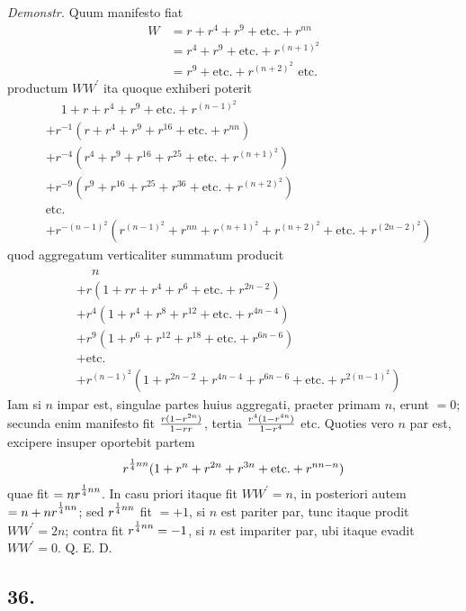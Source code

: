 \documentclass[twoside,12pt, showframe]{memoir}
\let\oldfrac\frac
\def\frac#1#2{\mathchoice{\tfrac{#1}{#2}}{\oldfrac{#1}{#2}}{\genfrac{}{}{}{2}{#1}{#2\mathstrut}}{\genfrac{}{}{}{3}{#1}{#2\mathstrut}}}
\begin{document}
\textit{Demonstr.} Quum manifesto fiat
\[\begin{aligned}
W & =r+r^{4}+r^{9}+\text{etc.}+r^{n n} \\
& =r^{4}+r^{9}+\text{etc.}+r^{(n+1)^{2}} \\
& =r^{9}+\text{etc.}+r^{(n+2)^{2}} \text{ etc.}
\end{aligned}\]
productum \(W {W}^{\prime}\) ita quoque exhiberi poterit
\[\begin{aligned}
&\phantom{ +, } 1+r+r^{4}+r^{9}+\text{etc.}+r^{(n-1)^{2}} \\
&+ r^{-1}(r+r^{4}+r^{9}+r^{16}+\text{etc.}+r^{n n}) \\
&+ r^{-4}(r^{4}+r^{9}+r^{16}+r^{25}+\text{etc.}+r^{(n+1)^{2}}) \\
&+ r^{-9}(r^{9}+r^{16}+r^{25}+r^{36}+\text{etc.}+r^{(n+2)^{2}}) \\
&\text{etc.} \\
&+ r^{-(n-1)^{2}}(r^{(n-1)^{2}}+r^{n n}+r^{(n+1)^{2}}+r^{(n+2)^{2}}+\text{etc.}+r^{(2 n-2)^{2}})
\end{aligned}\]
quod aggregatum verticaliter summatum producit
\[\begin{aligned}
&\phantom{+}n \\
&+r(1+r r+r^{4}+r^{6}+\text{etc.}+r^{2 n-2}) \\
&+r^{4}(1+r^{4}+r^{8}+r^{12}+\text{etc.}+r^{4 n-4}) \\
&+r^{9}(1+r^{6}+r^{12}+r^{18}+\text{etc.}+r^{6 n-6}) \\
&+\text{etc.} \\
&+r^{(n-1)^{2}}(1+r^{2 n-2}+r^{4 n-4}+r^{6 n-6}+\text{etc.}+r^{2(n-1)^{2}})
\end{aligned}\]
Iam si \(n\) impar est, singulae partes huius aggregati, praeter primam \(n\), erunt \(=0\); secunda enim manifesto fit \(\frac{r(1-r^{2 n})}{1-r r}\), tertia \(\frac{r^{4}(1-r^{4 n})}{1-r^{4}}\) etc. Quoties vero \(n\) par est, excipere insuper oportebit partem\clearpage\noindent%
\[r^{\frac{1}{4} n n}(1+r^{n}+r^{2 n}+r^{3 n}+\text{etc.}+r^{n n-n})\]
quae fit \(=n r^{\frac{1}{4} n n}\). In casu priori itaque fit \(W W^{\prime}=n\), in posteriori autem \(=n+n r^{\frac{1}{4} n n}\); sed \(r^{\frac{1}{4} n n}\) fit \(=+1\), si \(n\) est pariter par, tunc itaque prodit \(W W^{\prime}=2 n\); contra fit \(r^{\frac{1}{4} n n}=-1\), si \(n\) est impariter par, ubi itaque evadit \(W W^{\prime}=0\). Q. E. D.

\subsection*{36.}
 
\end{document}
